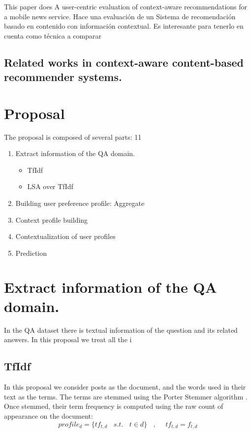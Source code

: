\documentclass[preprint]{elsarticle}
\begin{document}
\begin{spacing}{2}
\cite{DePessemier2016} This paper does A user-centric evaluation of context-aware recommendations for a mobile news service. Hace una evaluación de un Sistema de recomendación basado en contenido con información contextual. Es interesante para tenerlo en cuenta como técnica a comparar


\subsection{Related works in context-aware content-based recommender systems.}



\section{Proposal}

The proposal is composed of several parts:
11
\begin{enumerate}
	\item Extract information of the QA domain.
	\begin{itemize}
		\item TfIdf
		\item LSA over TfIdf
	\end{itemize}
	\item Building user preference profile: Aggregate 
	\item Context profile building
	\item Contextualization of user profiles
	\item Prediction
\end{enumerate}


\section{Extract information of the QA domain.}

In the QA dataset there is textual information of the question and its related answers. In this proposal we treat all the i

\subsection{TfIdf}

In this proposal we consider posts as the document, and the words used in their text as the terms. The terms are stemmed using the Porter Stemmer algorithm \citep{Porter1980}. Once stemmed, their term frequency is computed using the raw count of appearance on the document:
\begin{equation}
	profile_{d} = \{tf_{t,d}~~~~s.t.~~~~ t \in d \} ~~~~,  ~~~~~~
	tf_{t,d} = f_{t,d}
\end{equation}


\end{spacing}
\end{document}
